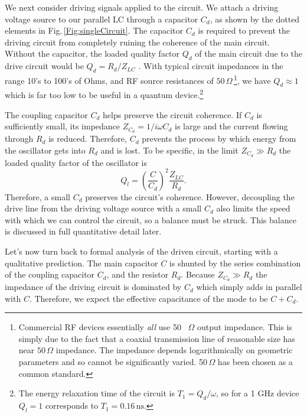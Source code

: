  \label{sec:driving}


We next consider driving signals applied to the circuit.
We attach a driving voltage source to our parallel LC through a capacitor $C_d$, as shown by the dotted elements in Fig.\,\ref{Fig:singleCircuit}.
The capacitor $C_d$ is required to prevent the driving circuit from completely ruining the coherence of the main circuit.
Without the capacitor, the loaded quality factor $Q_d$ of the main circuit due to the drive circuit would be $Q_d = R_d / Z_{LC}$ .
With typical circuit impedances in the range 10's to 100's of Ohms, and RF source resistances of $50\,\Omega$\,\footnote{Commercial RF devices essentially \emph{all} use 50 \, $\Omega$ output impedance. This is simply due to the fact that a coaxial transmission line of reasonable size has near $50 \, \Omega$ impedance. The impedance depends logarithmically on geometric parameters and so cannot be significantly varied. 50$ \, \Omega$ has been chosen as a common standard.}, we have $Q_d \approx 1$ which is far too low to be useful in a quantum device.\footnote{The energy relaxation time of the circuit is $T_1 = Q_d / \omega$, so for a 1 GHz device $Q_l=1$ corresponds to $T_1=0.16 \, \text{ns}$.}

The coupling capacitor $C_d$ helps preserve the circuit coherence.
If $C_d$ is sufficiently small, its impedance $Z_{C_d} = 1/i\omega C_d$ is large and the current flowing through $R_d$ is reduced.
Therefore, $C_d$ prevents the process by which energy from the oscillator gets into $R_d$ and is lost.
To be specific, in the limit $Z_{C_d} \gg R_d$ the loaded quality factor of the oscillator is 
\begin{equation}
Q_l = \left( \frac{C}{C_d} \right)^2 \frac{Z_{LC}}{R_d} .
\end{equation}
Therefore, a small $C_d$ preserves the circuit's coherence.
However, decoupling the drive line from the driving voltage source with a small $C_d$ also limits the speed with which we can control the circuit, so a balance must be struck.
This balance is discussed in full quantitative detail later.

Let's now turn back to formal analysis of the driven circuit, starting with a qualitative prediction.
The main capacitor $C$ is shunted by the series combination of the coupling capacitor $C_d$, and the resistor $R_d$.
Because  $Z_{C_d} \gg R_d$ the impedance of the driving circuit is dominated by $C_d$ which simply adds in parallel with $C$.
Therefore, we expect the effective capacitance of the mode to be $C+C_d$.

